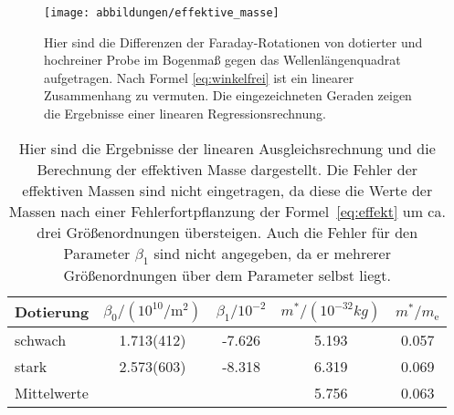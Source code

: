 \begin{figure}
  \centering
  \texttt{[image: abbildungen/effektive\_masse]}
  \caption{Hier sind die Differenzen der Faraday-Rotationen von
    dotierter und hochreiner Probe im Bogenmaß gegen das
    Wellenlängenquadrat aufgetragen.  Nach Formel \eqref{eq:winkelfrei}
    ist ein linearer Zusammenhang zu vermuten.  Die eingezeichneten
    Geraden zeigen die Ergebnisse einer linearen Regressionsrechnung.}
  \label{fig:linregress}
\end{figure}

\begin{table}
  \centering
  \begin{tabular}{lSSSS}
    \toprule
    {Dotierung} &
    {$\beta_0/(10^{10}\si{\per\meter\squared})$} &
    {$\beta_1/10^{-2}$} &
    {$m^*/(10^{-32}\si{kg})$} &
    {$m^*/m_\text{e}$}
    \\
    \midrule
    schwach & 1.713(412) & -7.626 & 5.193 & 0.057 \\
    stark & 2.573(603) & -8.318 & 6.319 & 0.069 \\
    \midrule
    Mittelwerte & & & 5.756 & 0.063\\
    \bottomrule
  \end{tabular}
  \caption{Hier sind die Ergebnisse der linearen Ausgleichsrechnung und
    die Berechnung der effektiven Masse dargestellt. Die Fehler der 
    effektiven Massen sind nicht eingetragen, da diese die Werte der 
    Massen nach einer 
    Fehlerfortpflanzung der Formel~\eqref{eq:effekt} um ca. drei 
    Größenordnungen übersteigen.  Auch die Fehler für den Parameter
    $\beta_1$ sind nicht angegeben, da er mehrerer Größenordnungen über
    dem Parameter selbst liegt.}
  \label{tab:linregress}
\end{table}
